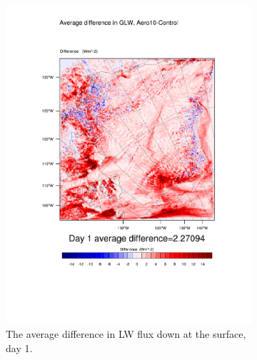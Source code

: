\begin{figure}
	\begin{subfigure}{0.48\textwidth}
		\centering
		\includegraphics[width=\textwidth]{results/aero10/diff_Aero10_GLW_Day1.pdf}
		\caption{The average difference in LW flux down at the surface, day 1.}
		\label{subfig:glw_r3Day1}
	\end{subfigure}
	\quad
	\begin{subfigure}{0.48\textwidth}
		\centering

\end{subfigure}
\end{figure}
